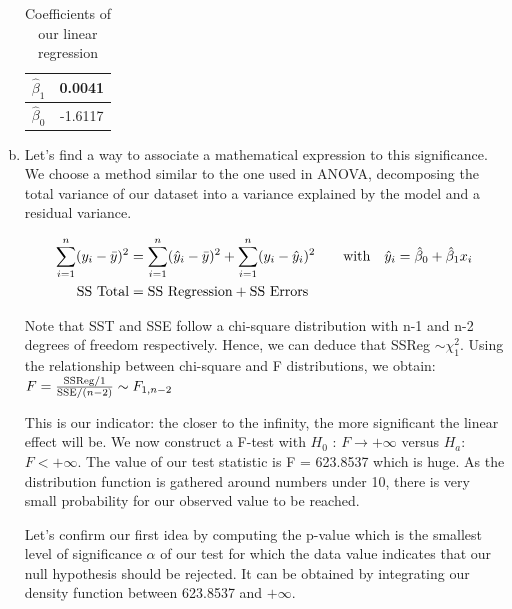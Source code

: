 \documentclass[a4paper]{article}
\begin{document}
\begin{enumerate}[(a)]
\begin{table}[h]
    \begin{centering}
    \begin{tabular}{|c|c|}
    \hline 
    $\hat{\beta}_1$ & 0.0041\tabularnewline
    \hline 
    $\hat{\beta}_0$ & -1.6117\tabularnewline
    \hline 
    \end{tabular}
    \par\end{centering}
    \caption{Coefficients of our linear regression}
\end{table}

\item Let's find a way to associate a mathematical expression to this significance. We choose a method similar to the one used in ANOVA, decomposing the total variance of our dataset into a variance explained by the model and a residual variance. 

\nonumber
\begin{equation} \label{eq1}
\begin{split}
\sum_{i=1}^n(y_i-\bar{y})^2 & = \sum_{i=1}^n(\hat{y}_i-\bar{y})^2 + \sum_{i=1}^n(y_i-\hat{y}_i)^2 \qquad \textup{with} \quad \hat{y}_i = \hat{\beta}_0 + \hat{\beta}_1 x_i \\
 \textup{SS Total} & = \textup{SS Regression} + \textup{SS Errors}
\end{split}
\end{equation}

Note that SST and SSE follow a chi-square distribution with n-1 and n-2 degrees of freedom respectively. Hence, we can deduce that SSReg $\sim \chi_1^2$. Using the relationship between chi-square and F distributions, we obtain: $F = \frac{\textup{SSReg}/1}{\textup{SSE}/(n-2)} \sim F_{1,n-2}$ 

This is our indicator: the closer to the infinity, the more significant  the linear effect will be. 
We now construct a F-test with $H_0$ : $F\rightarrow + \infty $ versus $H_a$: $F< +\infty$. The value of our test statistic is F = 623.8537 which is huge. As the distribution function is gathered around numbers under 10, there is very small probability for our observed value to be reached.

Let's confirm our first idea by computing the p-value which is the smallest level of significance $\alpha$ of our test for which the data value indicates that our null hypothesis should be rejected. It can be obtained by integrating our density function between 623.8537 and $+\infty$.


\end{enumerate}
\end{document}
